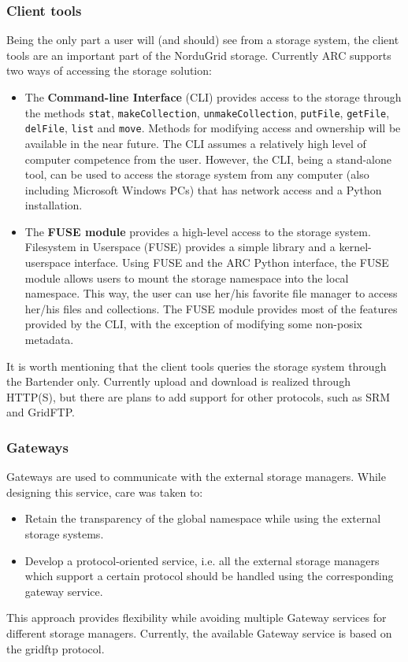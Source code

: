 \documentclass[final]{ieee}
\begin{document}
\subsubsection{Client tools }
\label{Client extension using FUSE module}

Being the only part a user will (and should) see from a storage
system, the client tools are an important part of the NorduGrid storage. Currently ARC supports two ways of accessing the
storage solution:
\begin{itemize}
\item The \textbf{Command-line Interface} (CLI) provides
  access to the storage through the methods \texttt{stat}, \texttt{makeCollection},
  \texttt{unmakeCollection}, \texttt{putFile}, \texttt{getFile}, \texttt{delFile},
  \texttt{list} and \texttt{move}. Methods for modifying
  access and ownership will be available in the near future. The CLI
  assumes a relatively high level of computer competence
  from the user. However, the CLI, being a stand-alone tool, can be
  used to access the storage system from any computer (also including
  Microsoft Windows PCs) that has network access and
  a Python installation.
\item The \textbf{FUSE module} provides a high-level access to the
  storage system. Filesystem in Userspace (FUSE) \cite{FUSE} provides a simple
  library and a kernel-userspace interface. Using FUSE and the ARC
  Python interface, the FUSE module allows users to mount the
  storage namespace into the local namespace. This way, the user
  can use her/his favorite file manager to access her/his files and
  collections. The FUSE module provides most of the features provided
  by the CLI, with the exception of modifying some non-posix metadata.
\end{itemize}
It is worth mentioning that the client tools queries the storage system
through the Bartender only. Currently upload and download is realized
through HTTP(S), but there are plans to add support for other
protocols, such as SRM and GridFTP.

\subsubsection{Gateways }
\label{Gateways}

Gateways are used to communicate with the external storage
managers. While designing this service, care was taken to: 
\begin{itemize}
\item Retain the transparency of the global namespace while using the external storage systems.
\item  Develop a protocol-oriented  service, i.e. all the external
  storage managers which support a certain protocol should be handled
  using the corresponding gateway service.  
\end{itemize}
This approach provides flexibility while avoiding multiple Gateway
services for different storage managers. Currently, the available
Gateway service is based on the gridftp protocol.  
\end{document}
